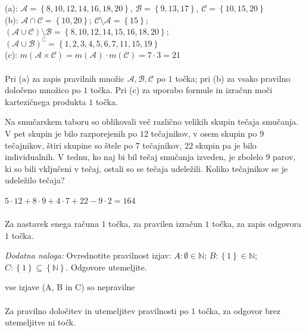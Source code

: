 \documentclass[addpoints]{exam}
\begin{document}
\begin{questions}
    \begin{solution}[13cm]
        (a): $\mathcal{A}=\left\{8, 10, 12, 14, 16, 18, 20\right\}$, $\mathcal{B}=\left\{9, 13, 17\right\}$, $\mathcal{C}=\left\{10, 15, 20\right\}$ \\
        (b): $\mathcal{A}\cap\mathcal{C}=\left\{10,20\right\}$; $\mathcal{C}\setminus\mathcal{A}=\left\{15\right\}$; $(\mathcal{A}\cup\mathcal{C})\setminus\mathcal{B}=\left\{8,10,12,14,15,16,18,20\right\}$; $(\mathcal{A}\cup\mathcal{B})^\complement=\left\{1,2,3,4,5,6,7,11,15,19\right\}$ \\
        (c): $m(\mathcal{A}\times\mathcal{C})=m(\mathcal{A})\cdot m(\mathcal{C})=7\cdot 3 = 21$ \\ \\
        Pri (a) za zapis pravilnih množic $\mathcal{A}, \mathcal{B}, \mathcal{C}$ po $1$ točka; pri (b) za vsako pravilno določeno množico po $1$ točka. Pri (c) za uporabo formule in izračun moči kartezičnega produkta $1$ točka.
    \end{solution}


        

    \question[3]
    Na smučarskem taboru so oblikovali več različno velikih skupin tečaja smučanja.
    V pet skupin je bilo razporejenih po $12$ tečajnikov, v osem skupin po $9$ tečajnikov, štiri skupine so štele po $7$ tečajnikov, $22$ skupin pa je bilo individualnih.
    V tednu, ko naj bi bil tečaj smučanja izveden, je zbolelo $9$ parov, ki so bili vključeni v tečaj, ostali so se tečaja udeležili.
    Koliko tečajnikov se je udeležilo tečaja?

    \begin{solution}[5cm]
        $5\cdot 12 + 8\cdot 9 + 4 \cdot 7 + 22 - 9 \cdot 2 = 164$ \\ \\
        Za nastavek enega računa $1$ točka, za pravilen izračun $1$ točka, za zapis odgovora $1$ točka.
    \end{solution}


\newpage

    \vspace{0.1in}

    \bonusquestion[3]
    \textit{Dodatna naloga:} Ovrednotite pravilnost izjav: $A: \emptyset\in\mathbb{N}$; $B:\left\{1\right\}\in\mathbb{N}$; $C: \left\{1\right\}\subseteq\left\{\mathbb{N}\right\}$. Odgovore utemeljite.
    \begin{solution}
        vse izjave (A, B in C) so nepravilne \\ \\
        Za pravilno določitev in utemeljitev pravilnosti po $1$ točka, za odgovor brez utemeljitve ni točk.
    \end{solution}

\end{questions}
\end{document}
